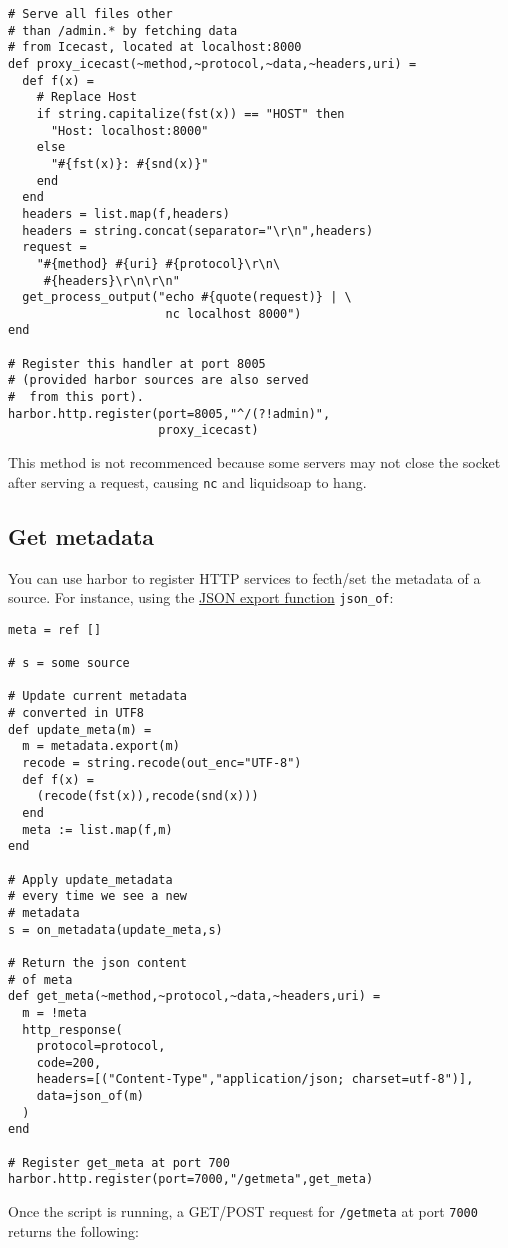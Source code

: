\begin{verbatim}
# Serve all files other
# than /admin.* by fetching data
# from Icecast, located at localhost:8000
def proxy_icecast(~method,~protocol,~data,~headers,uri) =
  def f(x) =
    # Replace Host
    if string.capitalize(fst(x)) == "HOST" then
      "Host: localhost:8000"
    else
      "#{fst(x)}: #{snd(x)}"
    end
  end
  headers = list.map(f,headers)
  headers = string.concat(separator="\r\n",headers)
  request =
    "#{method} #{uri} #{protocol}\r\n\
     #{headers}\r\n\r\n"
  get_process_output("echo #{quote(request)} | \
                      nc localhost 8000")
end

# Register this handler at port 8005
# (provided harbor sources are also served
#  from this port).
harbor.http.register(port=8005,"^/(?!admin)",
                     proxy_icecast)
\end{verbatim}
This method is not recommenced because some servers may not
close the socket after serving a request, causing \verb+nc+ and
liquidsoap to hang.

\subsection{Get metadata}
You can use harbor to register HTTP services to 
fecth/set the metadata of a source. For instance, 
using the \href{json.html}{JSON export function} \verb+json_of+:

\begin{verbatim}
meta = ref []

# s = some source

# Update current metadata
# converted in UTF8
def update_meta(m) =
  m = metadata.export(m)
  recode = string.recode(out_enc="UTF-8")
  def f(x) =
    (recode(fst(x)),recode(snd(x)))
  end
  meta := list.map(f,m)
end

# Apply update_metadata
# every time we see a new
# metadata
s = on_metadata(update_meta,s)

# Return the json content
# of meta
def get_meta(~method,~protocol,~data,~headers,uri) =
  m = !meta
  http_response(
    protocol=protocol,
    code=200,
    headers=[("Content-Type","application/json; charset=utf-8")],
    data=json_of(m)
  )
end

# Register get_meta at port 700
harbor.http.register(port=7000,"/getmeta",get_meta)
\end{verbatim}
Once the script is running, 
a GET/POST request for \verb+/getmeta+ at port \verb+7000+
returns the following:

